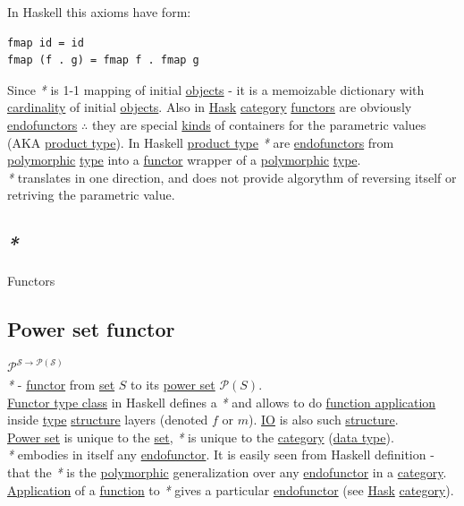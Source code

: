 \documentclass[a4paper,14pt,oneside]{book}
\begin{document}
In Haskell this axioms have form:\\
\begin{verbatim}
fmap id = id
fmap (f . g) = fmap f . fmap g
\end{verbatim}

Since \emph{*} is 1-1 mapping of initial \hyperref[orgc973d87]{objects} - it is a memoizable dictionary with \hyperref[org888a2a9]{cardinality} of initial \hyperref[orgc973d87]{objects}. Also in \hyperref[orga472ef8]{Hask} \hyperref[org74d6ac5]{category} \hyperref[org7eee6bb]{functors} are obviously \hyperref[org37f6cda]{endofunctors} \(\therefore\) they are special \hyperref[org52576a1]{kinds} of containers for the parametric values (AKA \hyperref[orgbbdeb0b]{product type}). In Haskell \hyperref[orgbbdeb0b]{product type} \emph{*} are \hyperref[org37f6cda]{endofunctors} from \hyperref[orgd6e543b]{polymorphic} \hyperref[orgdbcea73]{type} into a \hyperref[org4ae20fc]{functor} wrapper of a \hyperref[orgd6e543b]{polymorphic} \hyperref[orgdbcea73]{type}.\\

\emph{*} translates in one direction, and does not provide algorythm of reversing itself or retriving the parametric value.\\

\subsection{\emph{*}}
\label{sec:org37430a8}

\label{org7eee6bb}Functors\\

\subsection{\label{org0a4e29f}Power set functor}
\label{sec:org01dfa9e}
\(\mathcal{P^{S \to P(S)}}\)\\

\emph{*} - \hyperref[org4ae20fc]{functor} from \hyperref[org2ca93d9]{set} \(S\) to its \hyperref[org8596c2b]{power set} \(\mathcal{P}(S)\).\\

\hyperref[org112d285]{Functor type class} in Haskell defines a \emph{*} and allows to do \hyperref[org01158aa]{function application} inside \hyperref[orgdbcea73]{type} \hyperref[org69a0665]{structure} layers (denoted \(f\) or \(m\)). \hyperref[org786f026]{IO} is also such \hyperref[org69a0665]{structure}.\\
\hyperref[org8596c2b]{Power set} is unique to the \hyperref[org2ca93d9]{set}, \emph{*} is unique to the \hyperref[org74d6ac5]{category} (\hyperref[org1d671b5]{data type}).\\
\emph{*} embodies in itself any \hyperref[org816fcc1]{endofunctor}. It is easily seen from Haskell definition - that the \emph{*} is the \hyperref[orgd6e543b]{polymorphic} generalization over any \hyperref[org816fcc1]{endofunctor} in a \hyperref[org74d6ac5]{category}. \hyperref[org1793e06]{Application} of a \hyperref[org39271b2]{function} to \emph{*} gives a particular \hyperref[org816fcc1]{endofunctor} (see \hyperref[orga472ef8]{Hask} \hyperref[org74d6ac5]{category}).\\
\end{document}
